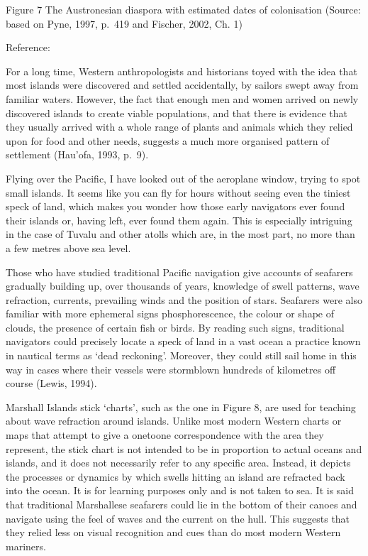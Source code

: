\documentclass[letterpaper,10pt,english]{sphinxmanual}
\let\sphinxpxdimen\pdfpxdimen\else\newdimen\sphinxpxdimen
\begin{document}
\sphinxincludegraphics[width=579\sphinxpxdimen,height=313\sphinxpxdimen]{{dd205_3_007i}.jpg}

Figure 7 The Austronesian diaspora with estimated dates of colonisation (Source: based on Pyne, 1997, p. 419 and Fischer, 2002, Ch. 1)

Reference:

For a long time, Western anthropologists and historians toyed with the idea that most islands were discovered and settled accidentally, by sailors swept away from familiar waters. However, the fact that enough men and women arrived on newly discovered islands to create viable populations, and that there is evidence that they usually arrived with a whole range of plants and animals which they relied upon for food and other needs, suggests a much more organised pattern of settlement (Hau’ofa,
1993, p. 9).

Flying over the Pacific, I have looked out of the aeroplane window, trying to spot small islands. It seems like you can fly for hours without seeing even the tiniest speck of land, which makes you wonder how those early navigators ever found their islands or, having left, ever found them again. This is especially intriguing in the case of Tuvalu and other atolls which are, in the most part, no more than a few metres above sea level.

Those who have studied traditional Pacific navigation give accounts of seafarers gradually building up, over thousands of years, knowledge of swell patterns, wave refraction, currents, prevailing winds and the position of stars. Seafarers were also familiar with more ephemeral signs \textendash{} phosphorescence, the colour or shape of clouds, the presence of certain fish or birds. By reading such signs, traditional navigators could precisely locate a speck of land in a vast ocean \textendash{} a practice known in
nautical terms as ‘dead reckoning’. Moreover, they could still sail home in this way in cases where their vessels were storm\sphinxhyphen{}blown hundreds of kilometres off course (Lewis, 1994).

Marshall Islands stick ‘charts’, such as the one in Figure 8, are used for teaching about wave refraction around islands. Unlike most modern Western charts or maps that attempt to give a one\sphinxhyphen{}to\sphinxhyphen{}one correspondence with the area they represent, the stick chart is not intended to be in proportion to actual oceans and islands, and it does not necessarily refer to any specific area. Instead, it depicts the processes or dynamics by which swells hitting an island are refracted back into the ocean. It
is for learning purposes only and is not taken to sea. It is said that traditional Marshallese seafarers could lie in the bottom of their canoes and navigate using the feel of waves and the current on the hull. This suggests that they relied less on visual recognition and cues than do most modern Western mariners.
\end{document}
